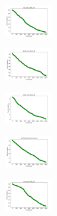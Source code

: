 \vspace*{\fill}
\newpage
\vspace*{\fill}

\begin{figure}[H]
    \centering
    \begin{subfigure}
        \centering
        \includegraphics[width=0.234\textwidth]{img/agesf/iris_set_const_20_949004259_cost.png}
    \end{subfigure}
    \hfill
    \begin{subfigure}
        \centering
        \includegraphics[width=0.234\textwidth]{img/agesf/ecoli_set_const_20_949004259_cost.png}
    \end{subfigure}
    \hfill
    \begin{subfigure}
        \centering
        \includegraphics[width=0.234\textwidth]{img/agesf/rand_set_const_20_949004259_cost.png}
    \end{subfigure}
    \hfill
    \begin{subfigure}
        \centering
        \includegraphics[width=0.234\textwidth]{img/agesf/newthyroid_set_const_20_949004259_cost.png}
    \end{subfigure}
    \hfill
    \begin{subfigure}
        \centering
        \includegraphics[width=0.234\textwidth]{img/agesf/iris_set_const_20_589741062_cost.png}

\end{subfigure}
\end{figure}
